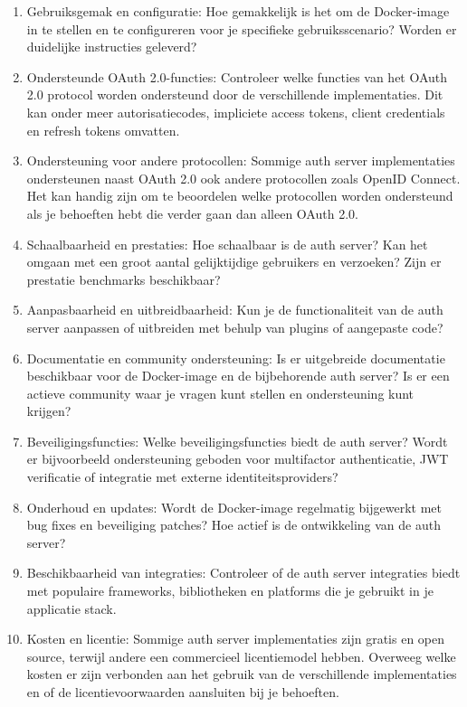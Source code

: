 \begin{enumerate}
  \item Gebruiksgemak en configuratie: Hoe gemakkelijk is het om de Docker-image in te stellen en te configureren voor je specifieke gebruiksscenario? Worden er duidelijke instructies geleverd?

  \item Ondersteunde OAuth 2.0-functies: Controleer welke functies van het OAuth 2.0 protocol worden ondersteund door de verschillende implementaties. Dit kan onder meer autorisatiecodes, impliciete access tokens, client credentials en refresh tokens omvatten.
  
  \item Ondersteuning voor andere protocollen: Sommige auth server implementaties ondersteunen naast OAuth 2.0 ook andere protocollen zoals OpenID Connect. Het kan handig zijn om te beoordelen welke protocollen worden ondersteund als je behoeften hebt die verder gaan dan alleen OAuth 2.0.
  
  \item Schaalbaarheid en prestaties: Hoe schaalbaar is de auth server? Kan het omgaan met een groot aantal gelijktijdige gebruikers en verzoeken? Zijn er prestatie benchmarks beschikbaar?
  
  \item Aanpasbaarheid en uitbreidbaarheid: Kun je de functionaliteit van de auth server aanpassen of uitbreiden met behulp van plugins of aangepaste code?
  
  \item Documentatie en community ondersteuning: Is er uitgebreide documentatie beschikbaar voor de Docker-image en de bijbehorende auth server? Is er een actieve community waar je vragen kunt stellen en ondersteuning kunt krijgen?
  
  \item Beveiligingsfuncties: Welke beveiligingsfuncties biedt de auth server? Wordt er bijvoorbeeld ondersteuning geboden voor multifactor authenticatie, JWT verificatie of integratie met externe identiteitsproviders?
  
  \item Onderhoud en updates: Wordt de Docker-image regelmatig bijgewerkt met bug fixes en beveiliging patches? Hoe actief is de ontwikkeling van de auth server?
  
  \item Beschikbaarheid van integraties: Controleer of de auth server integraties biedt met populaire frameworks, bibliotheken en platforms die je gebruikt in je applicatie stack.
  
  \item Kosten en licentie: Sommige auth server implementaties zijn gratis en open source, terwijl andere een commercieel licentiemodel hebben. Overweeg welke kosten er zijn verbonden aan het gebruik van de verschillende implementaties en of de licentievoorwaarden aansluiten bij je behoeften.
\end{enumerate}


